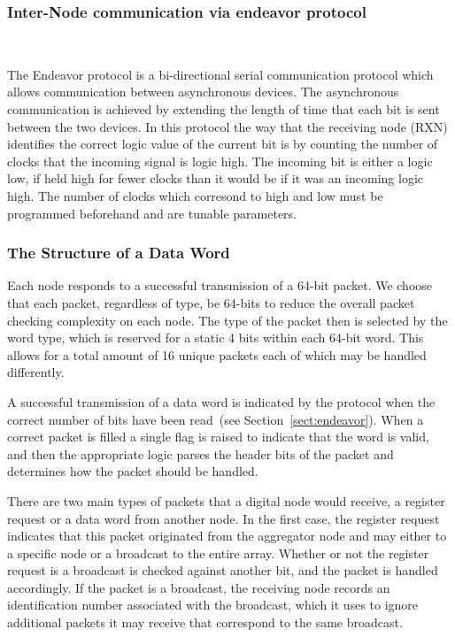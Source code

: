 \subsubsection{Inter-Node communication via endeavor protocol}
~\label{sect:endeavor}

The Endeavor protocol is a bi-directional serial communication protocol which allows communication between asynchronous devices.
The asynchronous communication is achieved by extending the length of time that each bit is sent between the two devices.
In this protocol the way that the receiving node (RXN) identifies the correct logic value of the current bit is by counting the number of clocks that the incoming signal is logic high.
The incoming bit is either a logic low, if held high for fewer clocks than it would be if it was an incoming logic high.
The number of clocks which corresond to high and low must be programmed beforehand and are tunable parameters.

\subsubsection{The Structure of a Data Word}

Each node responds to a successful transmission of a 64-bit packet.
We choose that each packet, regardless of type, be 64-bits to reduce the overall packet checking complexity on each node.
The type of the packet then is selected by the word type, which is reserved for a static 4 bits within each 64-bit word.
This allows for a total amount of 16 unique packets each of which may be handled differently.

A successful transmission of a data word is indicated by the protocol when the correct number of bits have been read~(see Section~\ref{sect:endeavor}).
When a correct packet is filled a single flag is raised to indicate that the word is valid, and then the appropriate logic parses the header bits of the packet and determines how the packet should be handled.

There are two main types of packets that a digital node would receive, a register request or a data word from another node.
In the first case, the register request indicates that this packet originated from the aggregator node and may either to a specific node or a broadcast to the entire array.
Whether or not the register request is a broadcast is checked against another bit, and the packet is handled accordingly.
If the packet is a broadcast, the receiving node records an identification number associated with the broadcast, which it uses to ignore additional packets it may receive that correspond to the same broadcast.

